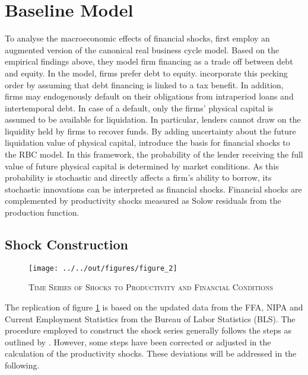 \section{Baseline Model}
\label{sec:baseline_model}

To analyse the macroeconomic effects of financial shocks, \citeauthor{JERMANNfinancial} first employ an augmented version of the canonical real business cycle model. Based on the empirical findings above, they model firm financing as a trade off between debt and equity. In the model, firms prefer debt to equity. \citeauthor{JERMANNfinancial} incorporate this pecking order by assuming that debt financing is linked to a tax benefit. In addition, firms may endogenously default on their obligations from intraperiod loans and intertemporal debt. In case of a default, only the firms' physical capital is assumed to be available for liquidation. In particular, lenders cannot draw on the liquidity held by firms to recover funds. By adding uncertainty about the future liquidation value of physical capital, \citeauthor{JERMANNfinancial} introduce the basis for financial shocks to the RBC model. In this framework, the probability of the lender receiving the full value of future physical capital is determined by market conditions. As this probability is stochastic and directly affects a firm's ability to borrow, its stochastic innovations can be interpreted as financial shocks. Financial shocks are complemented by productivity shocks measured as Solow residuals from the production function.


\subsection{Shock Construction}
\label{sec:shock_construction}

\begin{figure}[t]
    
    \centering

    \texttt{[image: ../../out/figures/figure\_2]}

    \caption{\textsc{Time Series of Shocks to Productivity and Financial Conditions}}
    
    \label{fig:figure_2}

\end{figure}

The replication of figure \ref{fig:figure_2} is based on the updated data from the FFA, NIPA and Current Employment Statistics from the Bureau of Labor Statistics (BLS). The procedure employed to construct the shock series generally follows the steps as outlined by \citeauthor{JERMANNfinancial}. However, some steps have been corrected or adjusted in the calculation of the productivity shocks. These deviations will be addressed in the following. 

